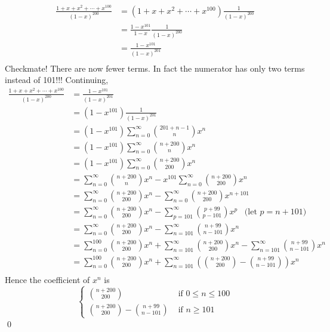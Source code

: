 \begin{align*}
\frac{1 + x + x^2 + \cdots + x^{100}}{(1 - x)^{200}}
&= (1 + x + x^2 + \cdots + x^{100}) \frac{1}{(1 - x)^{200}} \\
&= \frac{1 - x^{101}}{1 - x} \frac{1}{(1 - x)^{200}} \\
&= \frac{1 - x^{101}}{(1 - x)^{201}} \\
\end{align*}
Checkmate! There are now fewer terms.
In fact the numerator has only two terms instead of 101!!!
Continuing,      
\begin{align*}
\frac{1 + x + x^2 + \cdots + x^{100}}{(1 - x)^{200}}
&= \frac{1 - x^{101}}{(1 - x)^{201}} \\
&= (1 - x^{101}) \frac{1}{(1 - x)^{201}} \\
&= (1 - x^{101}) \sum_{n = 0}^\infty \binom{201 + n - 1}{n} x^n \\
&= (1 - x^{101}) \sum_{n = 0}^\infty \binom{n + 200}{n} x^n \\
&= (1 - x^{101}) \sum_{n = 0}^\infty \binom{n + 200}{200} x^n \\
&= \sum_{n = 0}^\infty \binom{n + 200}{n} x^n
- x^{101} \sum_{n = 0}^\infty \binom{n + 200}{200} x^n \\
&= \sum_{n = 0}^\infty \binom{n + 200}{200} x^n
- \sum_{n = 0}^\infty \binom{n + 200}{200} x^{n + 101} \\
&= \sum_{n = 0}^\infty \binom{n + 200}{200} x^n
- \sum_{p = 101}^\infty \binom{p + 99}{p - 101  } x^{p}
\,\,\,\,\, \text{(let $p = n + 101$)}\\
&= \sum_{n = 0}^\infty \binom{n + 200}{200} x^n
- \sum_{n   = 101}^\infty \binom{n + 99}{n - 101} x^{n}\\
&=
\sum_{n = 0}^{100} \binom{n + 200}{200} x^n
+ \sum_{n = 101}^\infty \binom{n + 200}{200} x^n
- \sum_{n   = 101}^\infty \binom{n + 99}{n - 101} x^{n}\\
&=
\sum_{n = 0}^{100} \binom{n + 200}{200} x^n
+
\sum_{n = 101}^\infty
\left(
        \binom{n + 200}{200} - \binom{n + 99}{n - 101}
\right) x^{n}\\
\end{align*}
Hence the coefficient of $x^n$ is
\[
\begin{cases}
\binom{n + 200}{200} & \text{ if $0 \leq n \leq 100$} \\
\binom{n + 200}{200} - \binom{n + 99}{n - 101}
& \text{ if $n \geq 101$}
\end{cases}
\]
\qed
